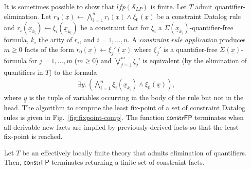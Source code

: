 \documentclass[conference]{llncs}
\begin{document}
{It is sometimes possible to show that
$\mathit{lfp}(\mathcal{S}_{\mathit{LP}})$ is finite. Let $T$ admit
quantifier-elimination. Let $r_0(\underline{x}) \leftarrow
\bigwedge_{i=1}^n r_i(\underline{x})\wedge \xi_0(\underline{x})$ be a
constraint Datalog rule and $r_i(\underline{x}_{k_i}) \leftarrow
\xi_i(\underline{x}_{k_i})$ be a constraint fact for $\xi_i$ a
$\Sigma(\underline{x}_{k_i})$-quantifier-free formula, $k_i$ the arity
of $r_i$, and $i=1, ..., n$. A \emph{constraint rule application}
produces $m\geq 0$ facts of the form $r_0(\underline{x}) \leftarrow
\xi_j'(\underline{x})$ where $\xi_j'$ is a quantifier-free
$\Sigma(\underline{x})$-formula for $j=1, ..., m$ ($m\geq 0$) and
$\bigvee_{j=1}^m \xi_j'$ is equivalent (by the elimination of
quantifiers in $T$) to the formula
\begin{eqnarray*}
  \exists \underline{y}.\, (\bigwedge_{i=1}^n \xi_i(\underline{x}_{k_i})
    \wedge \xi_0(\underline{x})) ,
\end{eqnarray*}
where $\underline{y}$ is the tuple of variables occurring in the body
of the rule but not in the head.  The algorithm to compute the least
fix-point of a set of constraint Datalog rules is given in
Fig.~\ref{fig:fixpoint-comp}. The function $\mathsf{constrFP}$ terminates when all
derivable new facts are implied by previously derived facts so that
the least fix-point is reached.
\begin{theorem}
  \label{coro:fixpoint-termination}
  Let $T$ be an effectively locally finite theory that admits
  elimination of quantifiers.  Then, $\mathsf{constrFP}$
  terminates returning a finite set of constraint facts.
\end{theorem}

}
\end{document}
